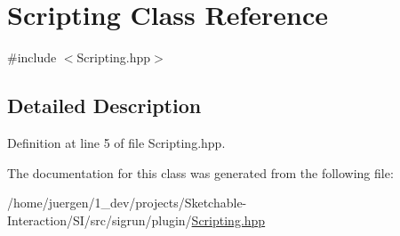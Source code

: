 \hypertarget{class_scripting}{}\section{Scripting Class Reference}
\label{class_scripting}


{\ttfamily \#include $<$Scripting.\+hpp$>$}



\subsection{Detailed Description}


Definition at line 5 of file Scripting.\+hpp.



The documentation for this class was generated from the following file\+:\begin{DoxyCompactItemize}
\item 
/home/juergen/1\+\_\+dev/projects/\+Sketchable-\/\+Interaction/\+S\+I/src/sigrun/plugin/\mbox{\hyperlink{_scripting_8hpp}{Scripting.\+hpp}}\end{DoxyCompactItemize}
